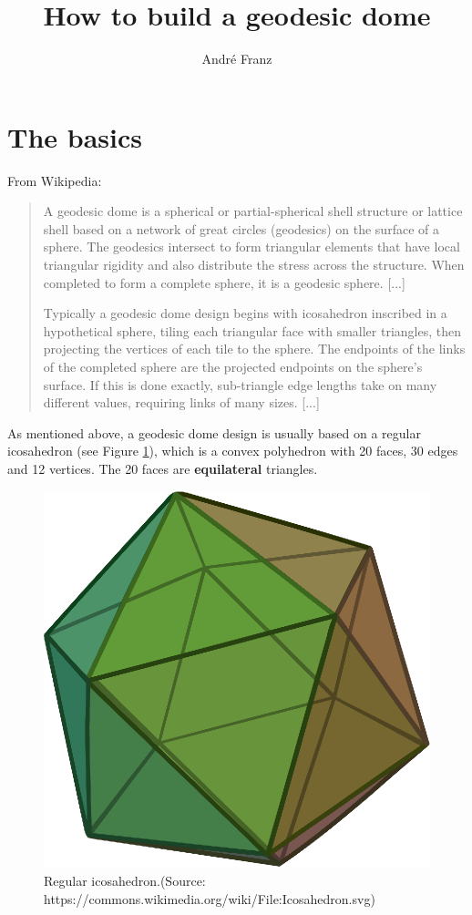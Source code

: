 \documentclass[a4paper,12pt]{article}
\title{How to build a geodesic dome}
\author{Andr\'{e} Franz}
\date{}
\begin{document}
\maketitle

\section{The basics}
From Wikipedia:
\begin{quote}
A geodesic dome is a spherical or partial-spherical shell structure or lattice shell based on a network of great circles (geodesics) on the surface of a sphere. The geodesics intersect to form triangular elements that have local triangular rigidity and also distribute the stress across the structure. When completed to form a complete sphere, it is a geodesic sphere. [...]

Typically a geodesic dome design begins with icosahedron inscribed in a hypothetical sphere, tiling each triangular face with smaller triangles, then projecting the vertices of each tile to the sphere. The endpoints of the links of the completed sphere are the projected endpoints on the sphere's surface. If this is done exactly, sub-triangle edge lengths take on many different values, requiring links of many sizes. [...]
\end{quote}

As mentioned above, a geodesic dome design is usually based on a regular icosahedron (see Figure \ref{fig:icosahedron}), which is a convex polyhedron with 20 faces, 30 edges and 12 vertices. The 20 faces are \textbf{equilateral} triangles.

\begin{figure}
	\centering
	\includegraphics[width=0.5\linewidth]{../images/icosahedron.eps}
	\caption{Regular icosahedron.\newline(Source: https://commons.wikimedia.org/wiki/File:Icosahedron.svg)}
	\label{fig:icosahedron}
\end{figure}
\end{document}
